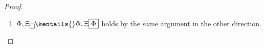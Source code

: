 \begin{scope}
\begin{proof}
\begin{description}
\begin{description}
\begin{enumerate}
            \item $\Phi, \ffillXi{} \kentails{} \Phi, \ffillXi{\Phi}$
            holds by the same argument in the other direction.
          \end{enumerate}


\end{description}
\end{description}
\end{proof}
\end{scope}
